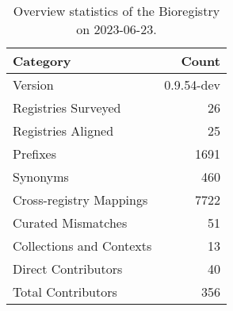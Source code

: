 \begin{table}
\caption{Overview statistics of the Bioregistry on 2023-06-23.}
\label{tab:bioregistry-summary}
\begin{tabular}{lr}
\toprule
Category & Count \\
\midrule
Version & 0.9.54-dev \\
Registries Surveyed & 26 \\
Registries Aligned & 25 \\
Prefixes & 1691 \\
Synonyms & 460 \\
Cross-registry Mappings & 7722 \\
Curated Mismatches & 51 \\
Collections and Contexts & 13 \\
Direct Contributors & 40 \\
Total Contributors & 356 \\
\bottomrule
\end{tabular}
\end{table}
